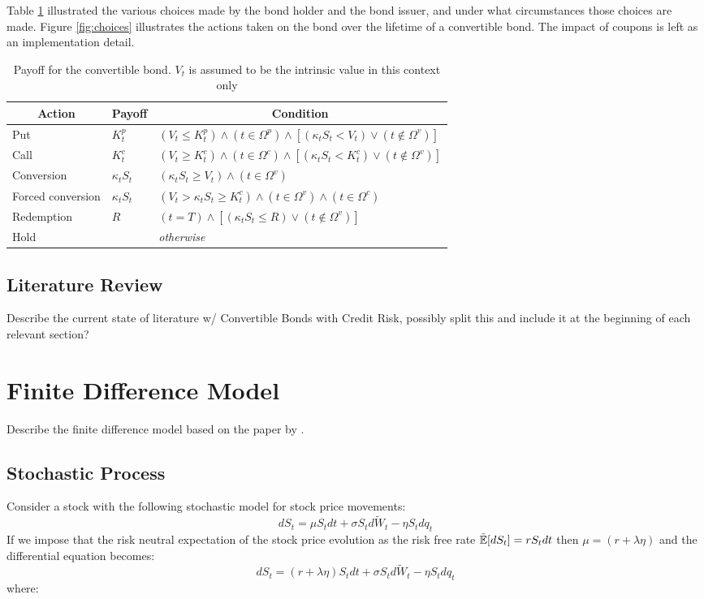 \documentclass[a4paper,11pt,oneside]{report}
\theoremstyle{plain}
\theoremstyle{definition}
\def\h{\\\hline}
\newcommand{\theader}[1]{\multicolumn{1}{|c|}{\textbf{#1}}}
\def\t{\ensuremath{t}\xspace}
\def\T{\ensuremath{T}\xspace}
\def\R{\ensuremath{R}\xspace}
\def\Kp{\ensuremath{K^{p}_t}\xspace}
\def\Kc{\ensuremath{K^{c}_t}\xspace}
\def\Kv{\ensuremath{\kappa_t}\xspace}
\def\Tp{\ensuremath{\Omega^{p}}\xspace}
\def\Tc{\ensuremath{\Omega^{c}}\xspace}
\def\Tv{\ensuremath{\Omega^{v}}\xspace}
\def\E[#1]{\Tilde{\mathbb{E}}\!\left[#1\right]}
\def\S{\ensuremath{S_t}\xspace}
\def\W{\ensuremath{\tilde{W}_t\xspace}}
\def\dS{\ensuremath{dS_t}\xspace}
\def\dt{\ensuremath{dt}\xspace}
\def\dW{\ensuremath{d\W}\xspace}
\def\dq{\ensuremath{dq_t}\xspace}
\def\V{\ensuremath{V_t}\xspace}
\begin{document}
Table \ref{tab:choices} illustrated the various choices made by the bond holder and the bond issuer, and under what circumstances those choices are made.  Figure \ref{fig:choices} illustrates the actions taken on the bond over the lifetime of a convertible bond.  The impact of coupons is left as an implementation detail.
\begin{table}[ht]
 \centering
 \begin{tabular}{|l|l|l|}\hline
  \theader{Action}    & \theader{Payoff} & \theader{Condition} \h
  Put                 & \Kp              & $(\V \le \Kp)\wedge(\t \in \Tp)\wedge[(\Kv\S < \V)\lor(\t \not\in \Tv)]$ \h
  Call                & \Kc              & $(\V \ge \Kc)\wedge(\t \in \Tc)\wedge[(\Kv\S < \Kc)\lor(\t \not\in\Tv)]$ \h
  Conversion          & $\Kv\S$          & $(\Kv\S \ge \V)\wedge(\t \in \Tv)$ \h
  Forced conversion   & $\Kv\S$          & $(\V > \Kv\S \ge \Kc)\wedge(\t \in \Tv)\wedge(\t \in \Tc)$ \h
  Redemption          & \R               & $(\t = \T)\wedge[(\Kv\S \le \R)\lor(\t \not\in \Tv)]$ \h
  Hold                &                  & \emph{otherwise} \h
 \end{tabular}
 \caption[Payoff for the convertible bond]{Payoff for the convertible bond.  \V is assumed to be the intrinsic value in this context only}
 \label{tab:choices}
\end{table}


\section{Literature Review}
Describe the current state of literature w/ Convertible Bonds with Credit Risk,
possibly split this and include it at the beginning of each relevant section?


\chapter{Finite Difference Model}
Describe the finite difference model based on the paper by \citet{AFV03}.


\section{Stochastic Process}
Consider a stock with the following stochastic model for stock price movements:
\begin{equation}
 \dS = \mu\S\dt + \sigma\S\dW - \eta\S\dq
\end{equation}
If we impose that the risk neutral expectation of the stock price evolution as the risk free rate $\E[\dS] = r\S\dt$ then $\mu = (r + \lambda\eta)$ and the differential equation becomes:
\begin{equation}
 \dS = (r + \lambda\eta)\S\dt + \sigma\S\dW - \eta\S\dq
\end{equation}
where:
\end{document}
